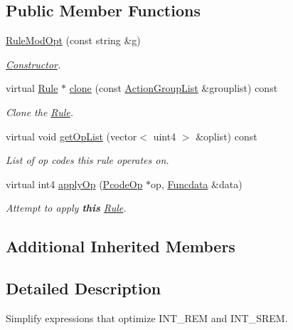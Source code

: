 \subsection*{Public Member Functions}
\begin{DoxyCompactItemize}
\item 
\mbox{\hyperlink{class_rule_mod_opt_aaec9e4e9e933b3f20a795abe568141e5}{Rule\+Mod\+Opt}} (const string \&g)
\begin{DoxyCompactList}\small\item\em \mbox{\hyperlink{class_constructor}{Constructor}}. \end{DoxyCompactList}\item 
virtual \mbox{\hyperlink{class_rule}{Rule}} $\ast$ \mbox{\hyperlink{class_rule_mod_opt_a45d5b1d80fa9bc5e5cd9dd4b134aa09b}{clone}} (const \mbox{\hyperlink{class_action_group_list}{Action\+Group\+List}} \&grouplist) const
\begin{DoxyCompactList}\small\item\em Clone the \mbox{\hyperlink{class_rule}{Rule}}. \end{DoxyCompactList}\item 
virtual void \mbox{\hyperlink{class_rule_mod_opt_a50bda7e2da175d530691d33dd8294172}{get\+Op\+List}} (vector$<$ uint4 $>$ \&oplist) const
\begin{DoxyCompactList}\small\item\em List of op codes this rule operates on. \end{DoxyCompactList}\item 
virtual int4 \mbox{\hyperlink{class_rule_mod_opt_ab868b1ba7b5ba982da1c316637d72c1e}{apply\+Op}} (\mbox{\hyperlink{class_pcode_op}{Pcode\+Op}} $\ast$op, \mbox{\hyperlink{class_funcdata}{Funcdata}} \&data)
\begin{DoxyCompactList}\small\item\em Attempt to apply {\bfseries{this}} \mbox{\hyperlink{class_rule}{Rule}}. \end{DoxyCompactList}\end{DoxyCompactItemize}
\subsection*{Additional Inherited Members}


\subsection{Detailed Description}
Simplify expressions that optimize I\+N\+T\+\_\+\+R\+EM and I\+N\+T\+\_\+\+S\+R\+EM. 

